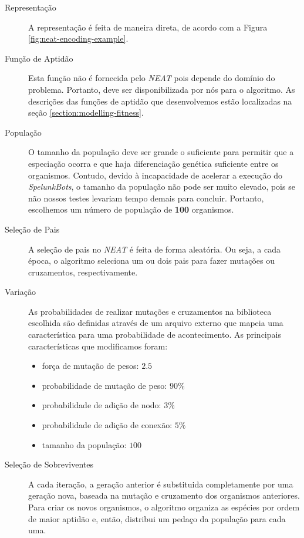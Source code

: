 \begin{description}
	\item[Representação]
		A representação é feita de maneira direta, de acordo com a Figura
		\ref{fig:neat-encoding-example}.

	\item[Função de Aptidão]
		Esta função não é fornecida pelo \textit{NEAT} pois depende do domínio
		do problema. Portanto, deve ser disponibilizada por nós para o
		algoritmo. As descrições das funções de aptidão que desenvolvemos estão
		localizadas na seção \ref{section:modelling-fitness}.

	\item[População]
		O tamanho da população deve ser grande o suficiente para permitir que a
		especiação ocorra e que haja diferenciação genética suficiente entre os
		organismos. Contudo, devido à incapacidade de acelerar a execução do
		\textit{SpelunkBots}, o tamanho da população não pode ser muito elevado,
		pois se não nossos testes levariam tempo demais para concluir. Portanto,
		escolhemos um número de população de \textbf{100} organismos.

	\item[Seleção de Pais] A seleção de pais no \textit{NEAT} é feita de forma
		aleatória. Ou seja, a cada época, o algoritmo seleciona um ou dois pais
		para fazer mutações ou cruzamentos, respectivamente.

	\item[Variação] As probabilidades de realizar mutações e cruzamentos na
		biblioteca escolhida são definidas através de um arquivo externo que
		mapeia uma característica para uma probabilidade de acontecimento. As
		principais características que modificamos foram:
		\begin{itemize}
				\item força de mutação de pesos: $2.5$
				\item probabilidade de mutação de peso: $90\%$
				\item probabilidade de adição de nodo: $3\%$
				\item probabilidade de adição de conexão: $5\%$
				\item tamanho da população: $100$
		\end{itemize}

	\item[Seleção de Sobreviventes]
		A cada iteração, a geração anterior é substituida completamente por uma
		geração nova, baseada na mutação e cruzamento dos organismos anteriores.
		Para criar os novos organismos, o algoritmo organiza as espécies por
		ordem de maior aptidão e, então, distribui um pedaço da população para
		cada uma.

\end{description}

